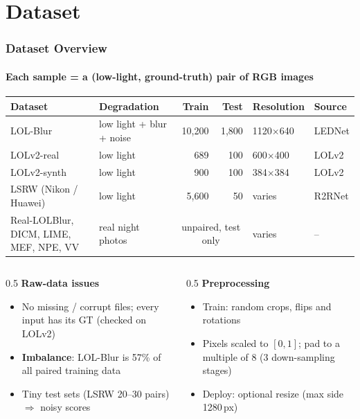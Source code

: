 \documentclass[
    11pt,%
    aspectratio=169,%
]{beamer}
\begin{document}
\section{Dataset}

\begin{frame}
    \frametitle{Dataset Overview}
    \framesubtitle{Each sample = a (low-light, ground-truth) pair of RGB images}

    \begin{center}
    \scriptsize
    \begin{tabular}{llrrll}
        \toprule
        \textbf{Dataset} & \textbf{Degradation} & \textbf{Train} & \textbf{Test} & \textbf{Resolution} & \textbf{Source} \\
        \midrule
        LOL-Blur     & low light + blur + noise & 10{,}200 & 1{,}800 & 1120$\times$640 & LEDNet \\
        LOLv2-real   & low light        & 689      & 100     & 600$\times$400 & LOLv2 \\
        LOLv2-synth  & low light        & 900      & 100     & 384$\times$384 & LOLv2 \\
        LSRW (Nikon / Huawei) & low light & 5{,}600 & 50   & varies & R2RNet \\
        \midrule
        Real-LOLBlur, DICM, LIME, MEF, NPE, VV & real night photos & \multicolumn{2}{c}{unpaired, test only} & varies & -- \\
        \bottomrule
    \end{tabular}
    \end{center}

    \begin{columns}[t]
        \begin{column}{0.5\textwidth}
            \footnotesize
            \textbf{Raw-data issues}
            \begin{itemize}
                \item No missing / corrupt files; every input has its GT (checked on LOLv2)
                \item \textbf{Imbalance}: LOL-Blur is 57\% of all paired training data
                \item Tiny test sets (LSRW 20--30 pairs) $\Rightarrow$ noisy scores
            \end{itemize}
        \end{column}
        \begin{column}{0.5\textwidth}
            \footnotesize
            \textbf{Preprocessing}
            \begin{itemize}
                \item Train: random crops, flips and rotations
                \item Pixels scaled to $[0, 1]$; pad to a multiple of 8 (3 down-sampling stages)
                \item Deploy: optional resize (max side 1280\,px)
            \end{itemize}
        \end{column}
    \end{columns}
\end{frame}
\end{document}
